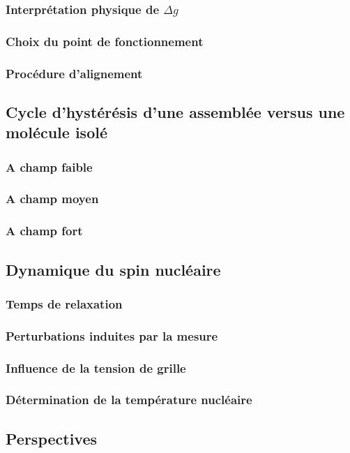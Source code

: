 \subsubsection{Interprétation physique de $\Delta g$}
\subsubsection{Choix du point de fonctionnement}
\subsubsection{Procédure d'alignement}

\subsection{Cycle d’hystérésis d'une assemblée versus une molécule isolé}
\subsubsection{A champ faible}
\subsubsection{A champ moyen}
\subsubsection{A champ fort}

\subsection{Dynamique du spin nucléaire}
\subsubsection{Temps de relaxation}
\subsubsection{Perturbations induites par la mesure}
\subsubsection{Influence de la tension de grille}
\subsubsection{Détermination de la température nucléaire}

\subsection{Perspectives}